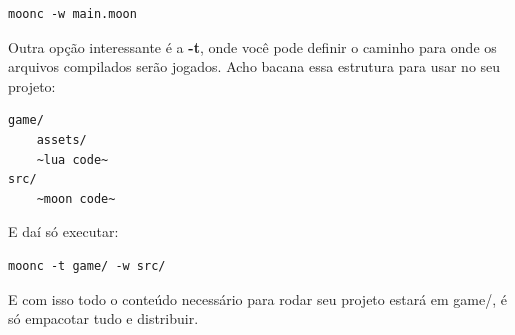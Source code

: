 \documentclass[a4paper,oneside,12pt]{article}
\begin{document}
\begin{lstlisting}
moonc -w main.moon
\end{lstlisting}

Outra opção interessante é a \textbf{-t}, onde você pode definir o caminho para onde os arquivos compilados serão jogados. Acho bacana essa estrutura para usar no seu projeto:

\begin{lstlisting}
game/
    assets/
    ~lua code~
src/
    ~moon code~
\end{lstlisting}

E daí só executar:

\begin{lstlisting}
moonc -t game/ -w src/
\end{lstlisting}

E com isso todo o conteúdo necessário para rodar seu projeto estará em game/, é só empacotar tudo e distribuir.
\end{document}
